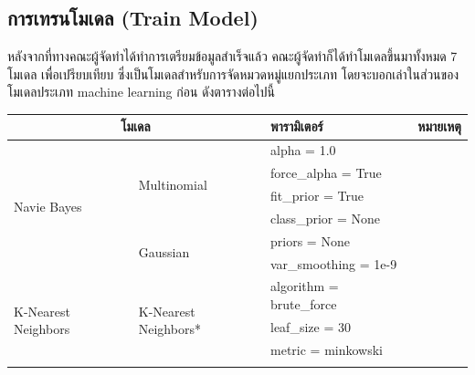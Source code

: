 \subsection{การเทรนโมเดล (Train Model)}
หลังจากที่ทางคณะผู้จัดทำได้ทำการเตรียมข้อมูลสำเร็จแล้ว คณะผู้จัดทำก็ได้ทำโมเดลขึ้นมาทั้งหมด 7 โมเดล เพื่อเปรียบเทียบ
ซึ่งเป็นโมเดลสำหรับการจัดหมวดหมู่แยกประเภท โดยจะบอกเล่าในส่วนของโมเดลประเภท machine learning ก่อน ดังตารางต่อไปนี้
\begin{table}[H]
    \begin{tabularx}{\textwidth}{|l|l|X|X|} \hline
        \multicolumn{2}{|c|}{โมเดล}                                   & พารามิเตอร์                       & หมายเหตุ                                                       \\ \hline
        \multirow{6}{*}{Navie Bayes}                                 & \multirow{4}{*}{Multinomial}    & alpha = 1.0              &                                    \\ \cline{3-4}
                                                                     &                                 & force\_alpha = True      &                                    \\ \cline{3-4}
                                                                     &                                 & fit\_prior = True        &                                    \\ \cline{3-4}
                                                                     &                                 & class\_prior = None      &                                    \\ \cline{2-4}
                                                                     & \multirow{2}{*}{Gaussian}       & priors = None            &                                    \\ \cline{3-4}
                                                                     &                                 & var\_smoothing = 1e-9    &                                    \\ \hline
        \multirow{7}{*}{K-Nearest Neighbors}                                 & \multirow{6}{*}{K-Nearest Neighbors*}   & algorithm = brute\_force &                                    \\ \cline{3-4}
                                                                     &                                 & leaf\_size = 30          &                                    \\ \cline{3-4}
                                                                     &                                 & metric = minkowski       &                                    \\ \cline{3-4}

\end{tabularx}
\end{table}
